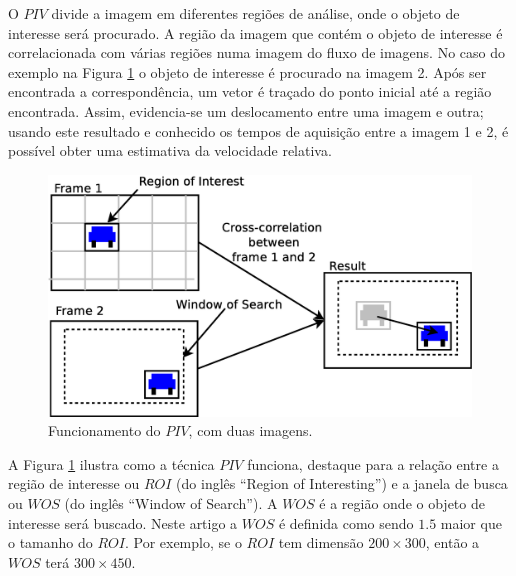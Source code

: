 O $PIV$ divide a imagem em diferentes regiões de análise, onde o objeto de interesse será procurado. 
A região da imagem que contém o objeto de interesse é correlacionada 
com várias regiões numa imagem do fluxo de imagens. No caso do exemplo na 
Figura \ref{fig:twoframes} o objeto de interesse é procurado na imagem 2. 
Após ser encontrada a correspondência, um vetor é traçado do ponto inicial
até a região encontrada. Assim, evidencia-se um deslocamento entre uma imagem e outra; usando este resultado
e conhecido os tempos de aquisição entre a imagem 1 e 2,
é possível obter uma  estimativa da velocidade relativa.
\begin{figure}[H]
\centering
\includegraphics[width=0.9\columnwidth]{images/explanationPIV.eps}
\caption{Funcionamento do $PIV$, com duas imagens.}
\label{fig:twoframes}
\end{figure}

A Figura \ref{fig:twoframes} ilustra como a técnica $PIV$ funciona, 
destaque para a relação entre a região de interesse ou $ROI$ (do inglês ``Region of Interesting'') e 
a janela de busca ou $WOS$  (do inglês ``Window of Search''). 
A $WOS$ é a região onde o objeto de interesse será buscado.
Neste artigo a $WOS$ é definida como sendo $1.5$ maior que o tamanho do $ROI$. 
Por exemplo, se o $ROI$ tem dimensão $200\times300$, então a $WOS$ terá $300\times450$.


